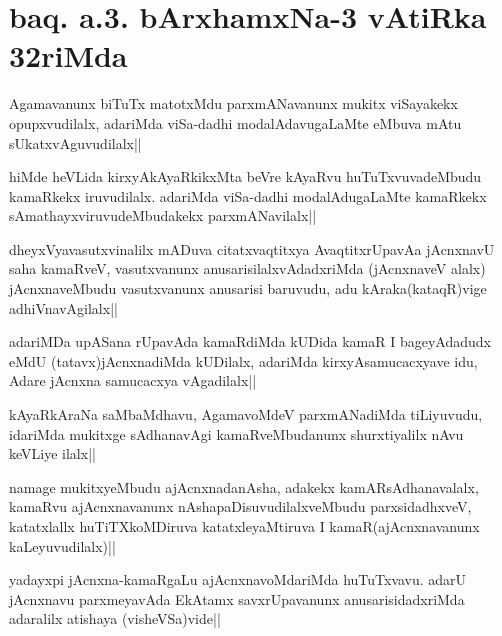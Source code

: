 \section*{baq. a.3. bArxhamxNa-3 vAtiRka 32riMda}

\begin{artha}
Agamavanunx biTuTx matotxMdu parxmANavanunx mukitx viSayakekx opupxvudilalx, adariMda 
viSa-dadhi modalAdavugaLaMte eMbuva mAtu sUkatxvAguvudilalx||
\end{artha}

\begin{artha}
hiMde heVLida kirxyAkAyaRkikxMta beVre kAyaRvu huTuTxvuvadeMbudu kamaRkekx iruvudilalx. adariMda viSa-dadhi modalAdugaLaMte kamaRkekx sAmathayxviruvudeMbudakekx parxmANavilalx||
\end{artha}


\begin{artha}
dheyxVyavasutxvinalilx mADuva citatxvaqtitxya AvaqtitxrUpavAa jAcnxnavU saha kamaRveV, vasutxvanunx anusarisilalxvAdadxriMda (jAcnxnaveV alalx) jAcnxnaveMbudu vasutxvanunx anusarisi baruvudu, adu kAraka(kataqR)vige adhiVnavAgilalx||
\end{artha}

\begin{artha}
adariMDa upASana rUpavAda kamaRdiMda kUDida kamaR I bageyAdadudx eMdU (tatavx)jAcnxnadiMda kUDilalx, adariMda kirxyAsamucacxyave idu, Adare jAcnxna samucacxya vAgadilalx||
\end{artha}


\begin{artha}
kAyaRkAraNa saMbaMdhavu, AgamavoMdeV parxmANadiMda tiLiyuvudu, idariMda mukitxge sAdhanavAgi kamaRveMbudanunx shurxtiyalilx nAvu keVLiye ilalx||
\end{artha}


\begin{artha}
namage mukitxyeMbudu ajAcnxnadanAsha, adakekx kamARsAdhanavalalx, kamaRvu ajAcnxnavanunx nAshapaDisuvudilalxveMbudu parxsidadhxveV, katatxlallx huTiTXkoMDiruva katatxleyaMtiruva I kamaR(ajAcnxnavanunx kaLeyuvudilalx)||
\end{artha}


\begin{artha}
yadayxpi jAcnxna-kamaRgaLu ajAcnxnavoMdariMda huTuTxvavu. adarU jAcnxnavu parxmeyavAda EkAtamx savxrUpavanunx anusarisidadxriMda adaralilx atishaya (visheVSa)vide||
\end{artha}

